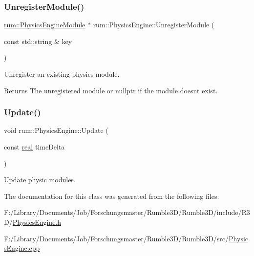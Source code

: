 \subsubsection{\texorpdfstring{Unregister\+Module()}{UnregisterModule()}}
{\footnotesize\ttfamily \hyperlink{classrum_1_1_physics_engine_module}{rum\+::\+Physics\+Engine\+Module} $\ast$ rum\+::\+Physics\+Engine\+::\+Unregister\+Module (\begin{DoxyParamCaption}\item[{const std\+::string \&}]{key }\end{DoxyParamCaption})}

Unregister an existing physics module. \begin{DoxyReturn}{Returns}
The unregistered module or nullptr if the module doesn\textquotesingle{}t exist. 
\end{DoxyReturn}
\mbox{\label{classrum_1_1_physics_engine_af48e5bd066198391bd5c7284b51a6633}} 
\subsubsection{\texorpdfstring{Update()}{Update()}}
{\footnotesize\ttfamily void rum\+::\+Physics\+Engine\+::\+Update (\begin{DoxyParamCaption}\item[{const \hyperlink{namespacerum_a7e8cca23573d5eaead0f138cbaa4862c}{real}}]{time\+Delta }\end{DoxyParamCaption})}

Update physic modules. 

The documentation for this class was generated from the following files\+:\begin{DoxyCompactItemize}
\item 
F\+:/\+Library/\+Documents/\+Job/\+Forschungsmaster/\+Rumble3\+D/\+Rumble3\+D/include/\+R3\+D/\hyperlink{_physics_engine_8h}{Physics\+Engine.\+h}\item 
F\+:/\+Library/\+Documents/\+Job/\+Forschungsmaster/\+Rumble3\+D/\+Rumble3\+D/src/\hyperlink{_physics_engine_8cpp}{Physics\+Engine.\+cpp}\end{DoxyCompactItemize}

